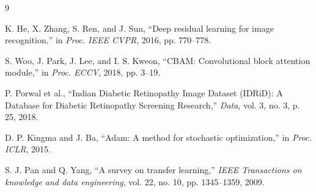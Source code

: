 \documentclass[10pt, letterpaper, twocolumn]{article}
\begin{document}
\newpage
\begin{thebibliography}{9}

K. He, X. Zhang, S. Ren, and J. Sun, ``Deep residual learning for image recognition,'' in \textit{Proc. IEEE CVPR}, 2016, pp. 770--778.

S. Woo, J. Park, J. Lee, and I. S. Kweon, ``CBAM: Convolutional block attention module,'' in \textit{Proc. ECCV}, 2018, pp. 3--19.

P. Porwal et al., ``Indian Diabetic Retinopathy Image Dataset (IDRiD): A Database for Diabetic Retinopathy Screening Research,'' \textit{Data}, vol. 3, no. 3, p. 25, 2018.

D. P. Kingma and J. Ba, ``Adam: A method for stochastic optimization,'' in \textit{Proc. ICLR}, 2015.

S. J. Pan and Q. Yang, ``A survey on transfer learning,'' \textit{IEEE Transactions on knowledge and data engineering}, vol. 22, no. 10, pp. 1345--1359, 2009.

\end{thebibliography}
\end{document}
